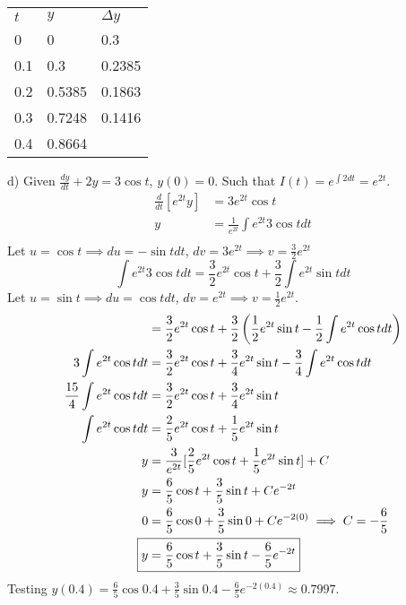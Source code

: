 \documentclass{article}
\begin{document}
\begin{center}
\begin{tabular}{l|l|l}
  $t$ & $y$    & $\Delta y$ \\
  0   & 0      & 0.3        \\
  0.1 & 0.3    & 0.2385     \\
  0.2 & 0.5385 & 0.1863     \\
  0.3 & 0.7248 & 0.1416     \\
  0.4 & 0.8664  &           
\end{tabular}
\end{center}
\noindent
d) Given $\frac{dy}{dt} + 2y  = 3\cos t$, $y(0) =0$.
Such that $I(t) = e^{\int 2 dt} = e^{2t}$.
\begin{align*}
  \frac{d}{dt} [e^{2t}y] &= 3 e^{2t} \cos t \\
  y &= \frac{1}{e^{2t}} \int e^{2t} 3 \cos t dt \\
\end{align*}
Let $u = \cos t \implies du = -\sin t dt$, $dv = 3 e^{2t} \implies v = \frac{3}{2} e^{2t}$
$$ \int e^{2t} 3 \cos t dt = \frac{3}{2} e^{2t} \cos t + \frac{3}{2} \int e^{2t} \sin t dt $$
Let $u = \sin t \implies du = \cos t dt$, $dv = e^{2t} \implies v = \frac{1}{2} e^{2t}$.
\begin{align*}
&= \frac{3}{2} e^{2t} \cos t + \frac{3}{2} \left( \frac{1}{2} e^{2t} \sin t - \frac{1}{2} \int e^{2t} \cos t dt \right) \\
3 \int e^{2t} \cos t dt &= \frac{3}{2} e^{2t} \cos t + \frac{3}{4} e^{2t} \sin t - \frac{3}{4} \int e^{2t} \cos t dt \\
\frac{15}{4} \int e^{2t} \cos t dt &= \frac{3}{2} e^{2t} \cos t + \frac{3}{4} e^{2t} \sin t \\
\int e^{2t} \cos t dt &= \frac{2}{5} e^{2t} \cos t + \frac{1}{5} e^{2t} \sin t \\
y &= \frac{3}{e^{2t}} [\frac{2}{5} e^{2t} \cos t + \frac{1}{5} e^{2t} \sin t] + C \\
y &= \frac{6}{5} \cos t + \frac{3}{5} \sin t + Ce^{-2t} \\
0 &= \frac{6}{5} \cos 0 + \frac{3}{5} \sin 0 + Ce^{-2(0)} \implies C = -\frac{6}{5} \\
\Aboxed{y &= \frac{6}{5} \cos t + \frac{3}{5} \sin t - \frac{6}{5} e^{-2t}}
\end{align*}
Testing $y(0.4) = \frac{6}{5} \cos 0.4 + \frac{3}{5} \sin 0.4 - \frac{6}{5} e^{-2(0.4)} \boxed{\approx 0.7997}$. \\
\end{document}
